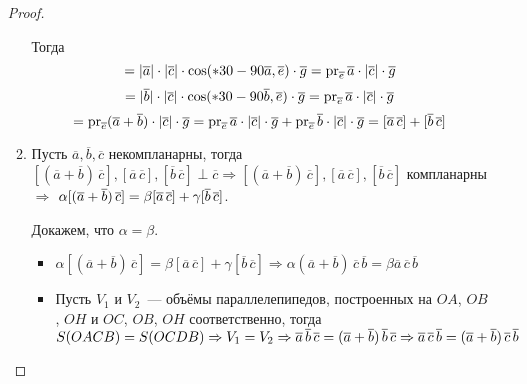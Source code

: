 \begin{enumerate}
\begin{proof}
\begin{enumerate}
		Тогда
		\begin{equation*}
		[\overline a\,\overline c] = 
		|\overline a| \cdot |\overline c| \cdot \cos \angle(\overline a, \overline e) \cdot \overline g =
		\pr_{\overline e} \overline a \cdot |\overline c| \cdot \overline g
		\end{equation*}
		\begin{equation*}
		[\overline b\,\overline c] = 
		|\overline b| \cdot |\overline c| \cdot \cos \angle(\overline b, \overline e) \cdot \overline g =
		\pr_{\overline e} \overline a \cdot |\overline c| \cdot \overline g
		\end{equation*}
		\begin{equation*}
		[(\overline a + \overline b)\,\overline c] =
		\pr_{\overline e} (\overline a + \overline b) \cdot |\overline c| \cdot \overline g =
		\pr_{\overline e} \overline a \cdot |\overline c| \cdot \overline g +
		\pr_{\overline e} \overline b \cdot |\overline c| \cdot \overline g =
		[\overline a\,\overline c] + [\overline b\,\overline c]
		\end{equation*}
		
		\item Пусть $\overline a, \overline b, \overline c$ некомпланарны, тогда $[(\overline a + \overline b)\,\overline c], [\overline a\,\overline c], [\overline b\,\overline c] \perp \overline c \Rightarrow
		[(\overline a + \overline b)\,\overline c], [\overline a\,\overline c], [\overline b\,\overline c]$ компланарны $\Rightarrow$
		$\alpha [(\overline a + \overline b)\,\overline c] \opbr=
		\beta [\overline a\,\overline c] \opbr+ \gamma [\overline b\,\overline c]$.
		
		\begin{minipage}[t]{95mm}\noindent
		Докажем, что $\alpha = \beta$.
		\begin{itemize}
			\item $\alpha [(\overline a + \overline b)\,\overline c] =
			\beta [\overline a\,\overline c] + \gamma [\overline b\,\overline c] \Rightarrow
			\alpha (\overline a + \overline b)\,\overline c\,\overline b =
			\beta \overline a\,\overline c\,\overline b$
			
			\item Пусть $V_1$ и $V_2$~--- объёмы параллелепипедов, построенных на $OA$, $OB$, $OH$ и $OC$, $OB$, $OH$ соответственно, тогда $S(OACB) = S(OCDB) \opbr\Rightarrow
			V_1 = V_2 \opbr\Rightarrow
			\overline a\,\overline b\,\overline c = (\overline a + \overline b)\,\overline b\,\overline c \opbr\Rightarrow
			\overline a\,\overline c\,\overline b = (\overline a + \overline b)\,\overline c\,\overline b$
		\end{itemize}
		

\end{minipage}
\end{enumerate}
\end{proof}
\end{enumerate}
